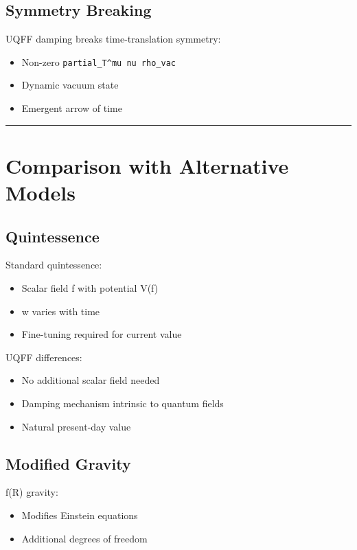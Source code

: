 \documentclass[12pt,a4paper]{article}
\begin{document}
\subsection{Symmetry Breaking}

UQFF damping breaks time-translation symmetry:

\begin{itemize}
  \item Non-zero \texttt{partial\_T\^{}mu nu rho\_vac}
  \item Dynamic vacuum state
  \item Emergent arrow of time
\end{itemize}

\medskip\hrule\medskip

\section{Comparison with Alternative Models}

\subsection{Quintessence}

Standard quintessence:

\begin{itemize}
  \item Scalar field f with potential V(f)
  \item w varies with time
  \item Fine-tuning required for current value
\end{itemize}

UQFF differences:

\begin{itemize}
  \item No additional scalar field needed
  \item Damping mechanism intrinsic to quantum fields
  \item Natural present-day value
\end{itemize}

\subsection{Modified Gravity}

f(R) gravity:

\begin{itemize}
  \item Modifies Einstein equations
  \item Additional degrees of freedom
\end{itemize}
\end{document}
